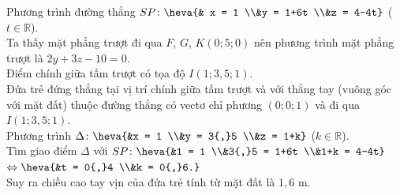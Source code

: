 \begin{bt}
{		Phương trình đường thẳng $SP\colon  \heva{& x = 1 \\&y = 1+6t \\&z = 4-4t}$ ($t \in \mathbb{R}$).\\
		Ta thấy mặt phẳng trượt đi qua $F$, $G$, $K(0;5;0)$ nên phương trình  mặt phẳng trượt là $2y+3z-10=0$.\\
		Điểm chính giữa tấm trượt có tọa độ  $I(1;3{,}5;1)$.\\
		Đứa trẻ đứng thẳng tại vị trí chính giữa tấm trượt và với thẳng tay (vuông góc với mặt  đất) thuộc đường thẳng có vectơ chỉ phương $(0;0;1)$ và đi qua $I(1;3{,}5;1)$.\\
		Phương trình  $\Delta\colon \heva{&x = 1 \\&y = 3{,}5 \\&z = 1+k}$ ($k \in \mathbb{R}$).\\
		Tìm giao điểm $\Delta$ với $SP\colon \heva{&1 = 1 \\&3{,}5 = 1+6t \\&1+k =  4-4t}$ $\Leftrightarrow \heva{&t = 0{,}4 \\&k = 0{,}6.}$\\
		 Suy ra chiều cao tay vịn của đứa trẻ tính từ mặt đất là $1{,}6$ m.
	 }
\end{bt}


